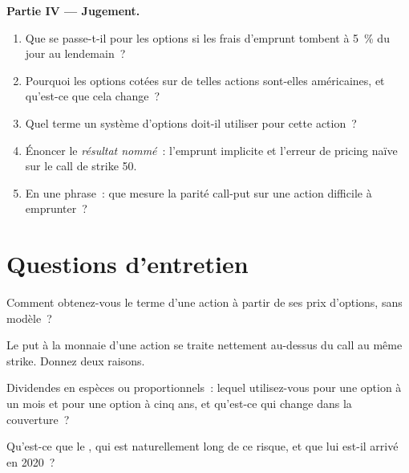 \begin{problem}
\medskip\noindent\textbf{Partie IV --- Jugement.}
\begin{enumerate}[resume]
\item Que se passe-t-il pour les options si les frais d'emprunt tombent à 5~\% du jour au lendemain~?
\item Pourquoi les options cotées sur de telles actions sont-elles américaines, et qu'est-ce que cela change~?
\item Quel terme un système d'options doit-il utiliser pour cette action~?
\item Énoncer le \emph{résultat nommé}~: l'emprunt implicite et l'erreur de pricing naïve sur
le call de strike 50.
\item En une phrase~: que mesure la parité call-put sur une action difficile à emprunter~?
\end{enumerate}
\end{problem}

\section{Questions d'entretien}

\begin{interviewq}\label{iq:dv:dividends-borrow-and-forwards:1}
Comment obtenez-vous le terme d'une action à partir de ses prix d'options, sans modèle~?
\end{interviewq}

\begin{interviewq}\label{iq:dv:dividends-borrow-and-forwards:2}
Le put à la monnaie d'une action se traite nettement au-dessus du call au même strike. Donnez deux
raisons.
\end{interviewq}

\begin{interviewq}\label{iq:dv:dividends-borrow-and-forwards:3}
Dividendes en espèces ou proportionnels~: lequel utilisez-vous pour une option à un mois et pour une
option à cinq ans, et qu'est-ce qui change dans la couverture~?
\end{interviewq}

\begin{interviewq}\label{iq:dv:dividends-borrow-and-forwards:4}
Qu'est-ce que le , qui est naturellement long de ce risque, et que lui est-il arrivé en 2020~?
\end{interviewq}

